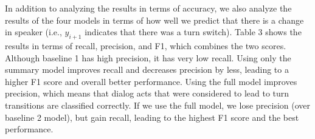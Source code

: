 In addition to analyzing the results in terms of accuracy, we also analyze the results of the four models in terms of how well we predict that there is a change in speaker (i.e., $y_{i+1}$  indicates that there was a turn switch).  Table 3 shows the results in terms of recall, precision, and F1, which combines the two scores.  Although baseline 1 has high precision, it has very low recall. Using only the summary model improves recall and decreases precision by less,
leading to a higher F1 score and overall better performance. Using the full model improves precision, which means that dialog acts
that were considered to lead to turn transitions are classified correctly. If we use the full model, we lose precision (over baseline 2 model), but gain recall,
leading to the highest F1 score and the best performance.



